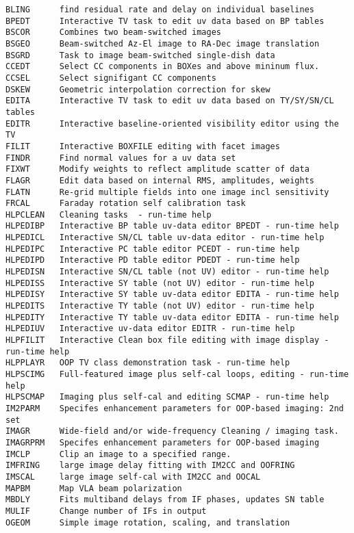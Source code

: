 \vskip 0.5pt
\bbve\begin{verbatim}
BLING      find residual rate and delay on individual baselines
BPEDT      Interactive TV task to edit uv data based on BP tables
BSCOR      Combines two beam-switched images
BSGEO      Beam-switched Az-El image to RA-Dec image translation
BSGRD      Task to image beam-switched single-dish data
CCEDT      Select CC components in BOXes and above mininum flux.
CCSEL      Select signifigant CC components
DSKEW      Geometric interpolation correction for skew
EDITA      Interactive TV task to edit uv data based on TY/SY/SN/CL tables
EDITR      Interactive baseline-oriented visibility editor using the TV
FILIT      Interactive BOXFILE editing with facet images
FINDR      Find normal values for a uv data set
FIXWT      Modify weights to reflect amplitude scatter of data
FLAGR      Edit data based on internal RMS, amplitudes, weights
FLATN      Re-grid multiple fields into one image incl sensitivity
FRCAL      Faraday rotation self calibration task
HLPCLEAN   Cleaning tasks  - run-time help
HLPEDIBP   Interactive BP table uv-data editor BPEDT - run-time help
HLPEDICL   Interactive SN/CL table uv-data editor - run-time help
HLPEDIPC   Interactive PC table editor PCEDT - run-time help
HLPEDIPD   Interactive PD table editor PDEDT - run-time help
HLPEDISN   Interactive SN/CL table (not UV) editor - run-time help
HLPEDISS   Interactive SY table (not UV) editor - run-time help
HLPEDISY   Interactive SY table uv-data editor EDITA - run-time help
HLPEDITS   Interactive TY table (not UV) editor - run-time help
HLPEDITY   Interactive TY table uv-data editor EDITA - run-time help
HLPEDIUV   Interactive uv-data editor EDITR - run-time help
HLPFILIT   Interactive Clean box file editing with image display - run-time help
HLPPLAYR   OOP TV class demonstration task - run-time help
HLPSCIMG   Full-featured image plus self-cal loops, editing - run-time help
HLPSCMAP   Imaging plus self-cal and editing SCMAP - run-time help
IM2PARM    Specifes enhancement parameters for OOP-based imaging: 2nd set
IMAGR      Wide-field and/or wide-frequency Cleaning / imaging task.
IMAGRPRM   Specifes enhancement parameters for OOP-based imaging
IMCLP      Clip an image to a specified range.
IMFRING    large image delay fitting with IM2CC and OOFRING
IMSCAL     large image self-cal with IM2CC and OOCAL
MAPBM      Map VLA beam polarization
MBDLY      Fits multiband delays from IF phases, updates SN table
MULIF      Change number of IFs in output
OGEOM      Simple image rotation, scaling, and translation

\end{verbatim}
